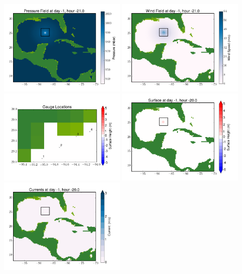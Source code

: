 \documentclass[11pt]{article}
\begin{document}
\includegraphics[width=0.475\textwidth]{frame0027fig8.png}
\vskip 10pt 
\includegraphics[width=0.475\textwidth]{frame0027fig9.png}
\includegraphics[width=0.475\textwidth]{frame0027fig10.png}
\vskip 10pt 
\includegraphics[width=0.475\textwidth]{frame0028fig1.png}
\includegraphics[width=0.475\textwidth]{frame0028fig2.png}
\end{document}
